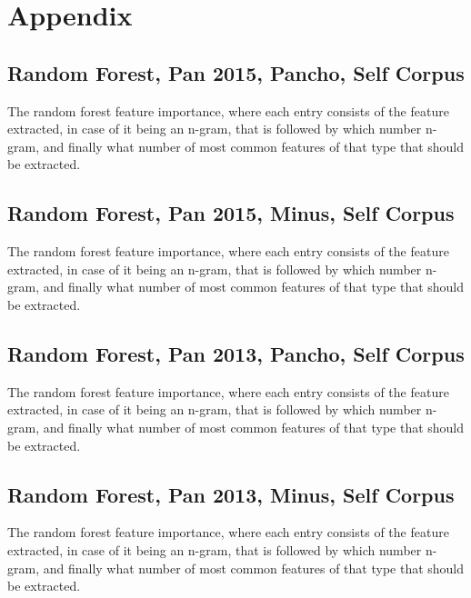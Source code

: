 \newpage
\section{Appendix}

\subsection{Random Forest, Pan 2015, Pancho, Self Corpus}
\label{Random Forest, Pan 2015, Pancho, Self Corpus}
The random forest feature importance, where each entry consists of the feature 
extracted, in case of it being an n-gram, that is followed by which number n-gram, and 
finally what number of most common features of that type that should be extracted.


\subsection{Random Forest, Pan 2015, Minus, Self Corpus}
\label{Random Forest, Pan 2015, Minus, Self Corpus}
The random forest feature importance, where each entry consists of the feature 
extracted, in case of it being an n-gram, that is followed by which number n-gram, and 
finally what number of most common features of that type that should be extracted.


\subsection{Random Forest, Pan 2013, Pancho, Self Corpus}
\label{Random Forest, Pan 2013, Pancho, Self Corpus}
The random forest feature importance, where each entry consists of the feature 
extracted, in case of it being an n-gram, that is followed by which number n-gram, and 
finally what number of most common features of that type that should be extracted.


\subsection{Random Forest, Pan 2013, Minus, Self Corpus}
\label{Random Forest, Pan 2013, Minus, Self Corpus}
The random forest feature importance, where each entry consists of the feature 
extracted, in case of it being an n-gram, that is followed by which number n-gram, and 
finally what number of most common features of that type that should be extracted.

